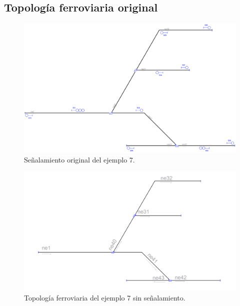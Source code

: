 \subsection{Topología ferroviaria original}

\lipsum[2]


\begin{figure}[H]
	\centering
	\includegraphics[width=1\textwidth]{resultados-obtenidos/ejemplo7/images/7_original.png}
	\centering\caption{Señalamiento original del ejemplo 7.}
\end{figure}

\lipsum[2]

\begin{figure}[H]
	\centering
	\includegraphics[width=1\textwidth]{resultados-obtenidos/ejemplo7/images/7_empty.png}
	\centering\caption{Topología ferroviaria del ejemplo 7 sin señalamiento.}
\end{figure}

\lipsum[2]
